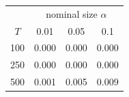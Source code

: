 % 
\begin{tabular}{cccc}
  \hline
  & \multicolumn{3}{c}{nominal size $\alpha$} \\
 $T$ & 0.01 & 0.05 & 0.1 \\
 \hline
100 & 0.000 & 0.000 & 0.000 \\ 
  250 & 0.000 & 0.000 & 0.000 \\ 
  500 & 0.001 & 0.005 & 0.009 \\ 
   \hline
\end{tabular}

